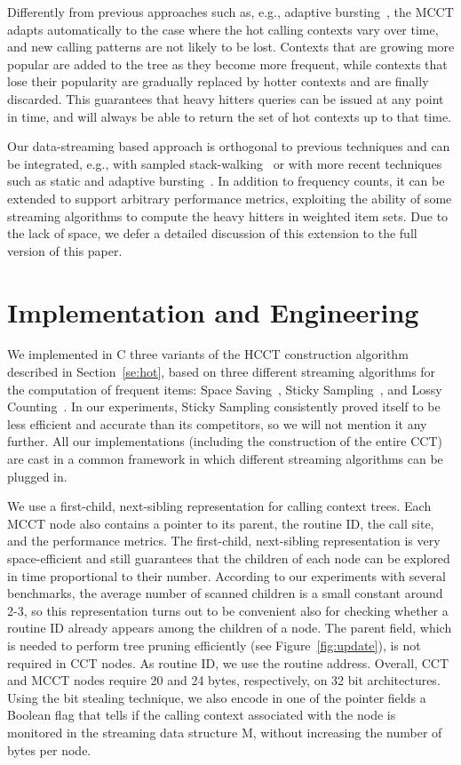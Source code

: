 \documentclass[preprint]{sigplanconf}
\begin{document}
Differently from previous approaches such as, e.g., adaptive bursting~\cite{ZSCC06}, the MCCT adapts automatically to the case where the hot calling contexts vary over time, and new calling patterns are not likely to be lost. Contexts that are growing more popular are added to the tree as they become more frequent, while contexts that lose their popularity are gradually replaced by hotter contexts and are finally discarded. This guarantees that heavy hitters queries can be issued at any point in time, and will always be able to return the set of hot contexts up to that time.

Our data-streaming based approach is orthogonal to previous techniques and can be integrated, e.g., with sampled stack-walking~\cite{AS00, W00} or with more recent techniques such as static and adaptive bursting~\cite{ZSCC06}. In addition to frequency counts, it can be extended to support arbitrary performance metrics, exploiting the ability of some streaming algorithms to compute the heavy hitters in weighted item sets. Due to the lack of space, we defer a detailed discussion of this extension to the full version of this paper.

\section{Implementation and Engineering}
\label{se:implementation}

We implemented in C three variants of the HCCT construction algorithm described in Section~\ref{se:hot}, based on three different streaming algorithms for the computation of frequent items: Space Saving~\cite{MAA06}, Sticky Sampling~\cite{MM02}, and Lossy Counting~\cite{MM02}. In our experiments, Sticky Sampling consistently proved itself to be less efficient and accurate than its competitors, so we will not mention it any further. All our implementations (including the construction of the entire CCT) are cast in a common framework in which different streaming algorithms can be plugged in.

We use a first-child, next-sibling representation for calling context trees. Each MCCT node also contains a pointer to its parent, the routine ID, the call site, and the performance metrics. The first-child, next-sibling representation is very space-efficient and still guarantees that the children of each node can be explored in time proportional to their number. According to our experiments with several benchmarks, the average number of scanned children is a small constant around 2-3, so this representation turns out to be convenient also for checking whether a routine ID already appears among the children of a node. The parent field, which is needed to perform tree pruning efficiently (see Figure~\ref{fig:update}), is not required in CCT nodes. As routine ID, we use the routine address. Overall, CCT and MCCT nodes require 20 and 24 bytes, respectively, on 32 bit architectures. Using the bit stealing technique, we also encode in one of the pointer fields a Boolean flag that tells if the calling context associated with the node is monitored in the streaming data structure M, without increasing the number of bytes per node. 
\end{document}
